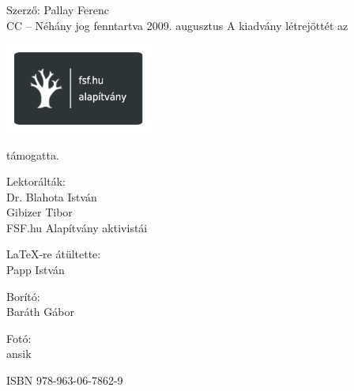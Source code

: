 \documentclass[a4paper,11pt,oneside]{book}
\begin{document}
\begin{center}
Szerző: Pallay Ferenc\\
CC -- Néhány jog fenntartva
\vfill
2009. augusztus
\vfill
\vfill
\vfill
A kiadvány létrejöttét az 

\includegraphics[width=4.851cm]{oocalcv1-img1.png}

támogatta.
\vfill
\vfill
\vfill

Lektorálták: \\
Dr. Blahota István\\
Gibizer Tibor\\
FSF.hu Alapítvány aktivistái

\vfill
\vfill
\LaTeX-re átültette:\\
Papp István

Borító:\\
Baráth Gábor

Fotó:\\
ansik

\vfill
ISBN 978-963-06-7862-9



\end{center}

\vfill
\vfill
{}

\clearpage
{}
\tableofcontents























\listoffigures
\listoftables
\end{document}
